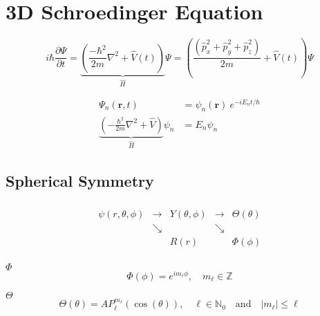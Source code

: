 \section{3D Schroedinger Equation}
\noindent\begin{equation*}
    i\hbar\frac{\partial\Psi}{\partial t} = \underbrace{\left(\frac{-\hbar^2}{2m}\nabla^2 + \widehat{V}(t)\right)}_{\widehat{H}}\Psi = \left(\frac{\left(\widehat{p}_x^2 + \widehat{p}_y^2 +\widehat{p}_z^2 \right)}{2m} + \widehat{V}(t)\right)\Psi
\end{equation*}

\begin{align*}
    \Psi_n(\mathbf{r},t)                                                                    & =\psi_n(\mathbf{r})\:e^{-iE_n t/\hbar} \\
    \underbrace{\left(-\frac{\hbar^2}{2m}\nabla^2 + \widehat{V}\right)}_{\widehat{H}}\psi_n & = E_n \psi_n
\end{align*}

\subsection{Spherical Symmetry}
\renewcommand{\arraystretch}{0.7}
\setlength{\oldtabcolsep}{\tabcolsep}\setlength\tabcolsep{0pt}
\noindent\begin{equation*}
    \begin{matrix}
                            &             &                 &                              \\
        \psi(r,\theta,\phi) & \rightarrow & Y(\theta, \phi) & \rightarrow & \Theta(\theta) \\
                            & \searrow    &                 & \searrow    &                \\
                            &             & R(r)            &             & \Phi(\phi)     \\
    \end{matrix}
\end{equation*}
\renewcommand{\arraystretch}{1}
\setlength\tabcolsep{\oldtabcolsep}

 $\Phi$
\begin{equation*}
    \Phi(\phi)=e^{i m_\ell \phi}, \quad m_\ell \in \mathbb{Z}
\end{equation*}

 $\Theta$
\begin{equation*}
    \Theta(\theta) = A P_{\ell}^{m_\ell}(\cos(\theta)), \quad \ell \in \mathbb{N}_0 \quad \text{and} \quad |m_\ell| \leq \ell
\end{equation*}

